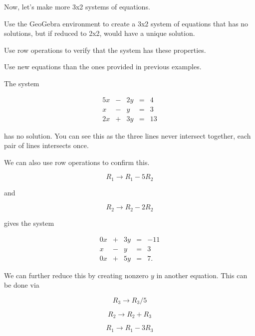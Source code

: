 \documentclass{ximera}
\begin{document}
    Now, let's make more 3x2 systems of equations.
    
    \begin{example}
    
        Use the GeoGebra environment to create a 3x2 system of equations that has no solutions, but if reduced to 2x2, would have a unique solution.
    
        Use row operations to verify that the system has these properties.
    
        Use new equations than the ones provided in previous examples. 
    \end{example}
    
        \begin{solution}
    
            The system
    
            $$\begin{array}{ccccc}
                    5x & -&2y&=&4 \\
                    x& -&y&=&3 \\
                    2x& +&3y&=&13
                \end{array}$$
    
            has no solution. You can see this as the three lines never intersect together, each pair of lines intersects once. 
    
            We can also use row operations to confirm this.
    
            $$R_1\rightarrow R_1-5R_2$$
    
            and
            
            $$R_2\rightarrow R_2-2R_2$$
    
            gives the system
    
            $$\begin{array}{ccccc}
                    0x & +&3y&=&-11 \\
                    x& -&y&=&3 \\
                    0x& +&5y&=&7.
                \end{array}$$
    
            We can further reduce this by creating nonzero $y$ in another equation. This can be done via
    
            $$R_3\rightarrow R_3/5$$
    
            $$R_2\rightarrow R_2+R_3$$
    
            $$R_1\rightarrow R_1-3R_3$$
    

\end{solution}
\end{document}
